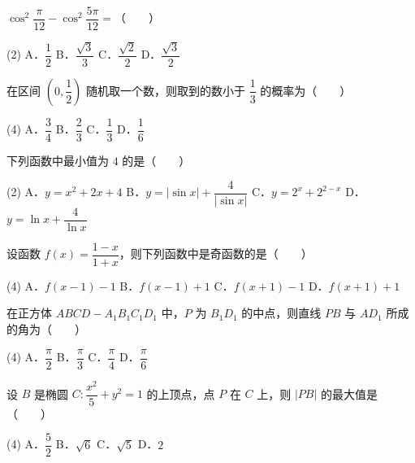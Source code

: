 \begin{question}
$\cos^2\dfrac{\pi}{12}-\cos^2\dfrac{5\pi}{12}=$\mbox{（　　）}

\begin{gkopts}(2)
\task A．$\dfrac12$
\task B．$\dfrac{\sqrt3}{3}$
\task C．$\dfrac{\sqrt2}{2}$
\task D．$\dfrac{\sqrt3}{2}$
\end{gkopts}

\end{question}
\begin{question}
在区间 $\left(0,\dfrac12\right)$ 随机取一个数，则取到的数小于 $\dfrac13$ 的概率为\mbox{（　　）}

\begin{gkopts}(4)
\task A．$\dfrac34$
\task B．$\dfrac23$
\task C．$\dfrac13$
\task D．$\dfrac16$
\end{gkopts}

\end{question}
\begin{question}
下列函数中最小值为 $4$ 的是\mbox{（　　）}

\begin{gkopts}(2)
\task A．$y=x^2+2x+4$
\task B．$y=|\sin x|+\dfrac4{|\sin x|}$
\task C．$y=2^x+2^{2-x}$
\task D．$y=\ln x+\dfrac4{\ln x}$
\end{gkopts}

\end{question}
\begin{question}
设函数 $f(x)=\dfrac{1-x}{1+x}$，则下列函数中是奇函数的是\mbox{（　　）}

\begin{gkopts}(4)
\task A．$f(x-1)-1$
\task B．$f(x-1)+1$
\task C．$f(x+1)-1$
\task D．$f(x+1)+1$
\end{gkopts}

\end{question}
\begin{question}
在正方体 $ABCD-A_1B_1C_1D_1$ 中，$P$ 为 $B_1D_1$ 的中点，则直线 $PB$ 与 $AD_1$ 所成的角为\mbox{（　　）}

\begin{gkopts}(4)
\task A．$\dfrac{\pi}{2}$
\task B．$\dfrac{\pi}{3}$
\task C．$\dfrac{\pi}{4}$
\task D．$\dfrac{\pi}{6}$
\end{gkopts}

\end{question}
\begin{question}
设 $B$ 是椭圆 $C:\dfrac{x^2}{5}+y^2=1$ 的上顶点，点 $P$ 在 $C$ 上，则 $|PB|$ 的最大值是\mbox{（　　）}

\begin{gkopts}(4)
\task A．$\dfrac52$
\task B．$\sqrt6$
\task C．$\sqrt5$
\task D．$2$
\end{gkopts}

\end{question}
